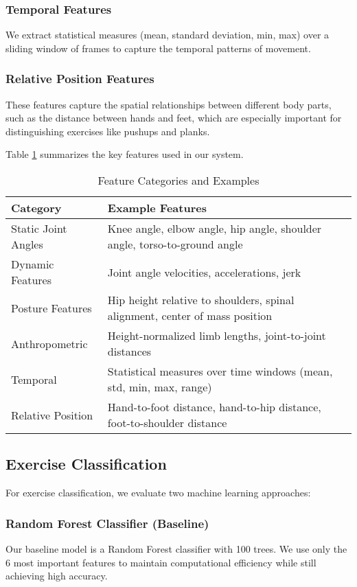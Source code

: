 \documentclass[conference]{IEEEtran}
\begin{document}
\subsubsection{Temporal Features}
We extract statistical measures (mean, standard deviation, min, max) over a sliding window of frames to capture the temporal patterns of movement.

\subsubsection{Relative Position Features}
These features capture the spatial relationships between different body parts, such as the distance between hands and feet, which are especially important for distinguishing exercises like pushups and planks.

Table \ref{tab:features} summarizes the key features used in our system.

\begin{table}[htbp]
\centering
\caption{Feature Categories and Examples}
\label{tab:features}
\begin{tabular}{@{}lp{5.5cm}@{}}
\toprule
\textbf{Category} & \textbf{Example Features} \\
\midrule
Static Joint Angles & Knee angle, elbow angle, hip angle, shoulder angle, torso-to-ground angle \\
\addlinespace
Dynamic Features & Joint angle velocities, accelerations, jerk \\
\addlinespace
Posture Features & Hip height relative to shoulders, spinal alignment, center of mass position \\
\addlinespace
Anthropometric & Height-normalized limb lengths, joint-to-joint distances \\
\addlinespace
Temporal & Statistical measures over time windows (mean, std, min, max, range) \\
\addlinespace
Relative Position & Hand-to-foot distance, hand-to-hip distance, foot-to-shoulder distance \\
\bottomrule
\end{tabular}
\end{table}

\subsection{Exercise Classification}
For exercise classification, we evaluate two machine learning approaches:

\subsubsection{Random Forest Classifier (Baseline)}
Our baseline model is a Random Forest classifier with 100 trees. We use only the 6 most important features to maintain computational efficiency while still achieving high accuracy.
\end{document}

